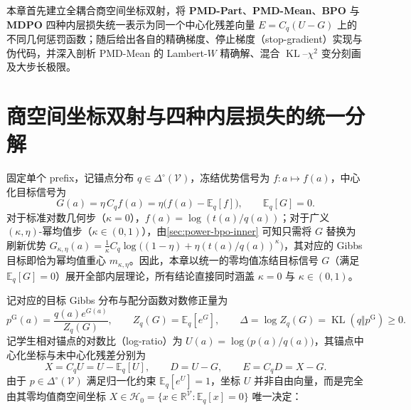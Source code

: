 \documentclass[lang=cn,scheme=chinese,openany]{../book/elegantbook}
\newcommand{\E}{\mathbb E}
\newcommand{\KL}{\operatorname{KL}}
\newcommand{\R}{\mathbb R}
\begin{document}
本章首先建立全耦合商空间坐标双射，将 \textbf{PMD-Part}、\textbf{PMD-Mean}、\textbf{BPO} 与 \textbf{MDPO} 四种内层损失统一表示为同一个中心化残差向量 $E=C_q(U-G)$ 上的不同几何惩罚函数；随后给出各自的精确梯度、停止梯度（stop-gradient）实现与伪代码，并深入剖析 PMD-Mean 的 Lambert-$W$ 精确解、混合 $\KL$--$\chi^2$ 变分刻画及大步长极限。

\section{商空间坐标双射与四种内层损失的统一分解}
\label{sec:quotient-bijection}

固定单个 prefix，记锚点分布 $q\in\Delta^\circ(\mathcal V)$，冻结优势信号为 $f:a\mapsto f(a)$，中心化目标信号为
\begin{equation}
 G(a)=\eta\,C_q f(a)=\eta\bigl(f(a)-\E_q[f]\bigr),
 \qquad \E_q[G]=0.
\end{equation}
对于标准对数几何步（$\kappa=0$），$f(a)=\log(t(a)/q(a))$；对于广义 $(\kappa,\eta)$-幂均值步（$\kappa\in(0,1)$），由\cref{sec:power-bpo-inner} 可知只需将 $G$ 替换为刷新优势 $G_{\kappa,\eta}(a)=\frac{1}{\kappa}C_q\log\bigl((1-\eta)+\eta(t(a)/q(a))^\kappa\bigr)$，其对应的 Gibbs 目标即恰为幂均值重心 $m_{\kappa,\eta}$。因此，本章以统一的零均值冻结目标信号 $G$（满足 $\E_q[G]=0$）展开全部内层理论，所有结论直接同时涵盖 $\kappa=0$ 与 $\kappa\in(0,1)$。

记对应的目标 Gibbs 分布与配分函数对数修正量为
\begin{equation}
 p^{\mathrm G}(a)=\frac{q(a)e^{G(a)}}{Z_q(G)},
 \qquad
 Z_q(G)=\E_q[e^G],
 \qquad
 \Delta=\log Z_q(G)=\KL(q\Vert p^{\mathrm G})\ge 0.
 \label{eq:ch4-gibbs-delta}
\end{equation}
记学生相对锚点的对数比（log-ratio）为 $U(a)=\log\bigl(p(a)/q(a)\bigr)$，其锚点中心化坐标与未中心化残差分别为
\begin{equation}
 X=C_q U=U-\E_q[U],
 \qquad
 D=U-G,
 \qquad
 E=C_q D=X-G.
 \label{eq:ch4-coordinates}
\end{equation}
由于 $p\in\Delta^\circ(\mathcal V)$ 满足归一化约束 $\E_q[e^U]=1$，坐标 $U$ 并非自由向量，而是完全由其零均值商空间坐标 $X\in\mathcal H_0=\{x\in\R^{\mathcal V}:\E_q[x]=0\}$ 唯一决定：
\end{document}
